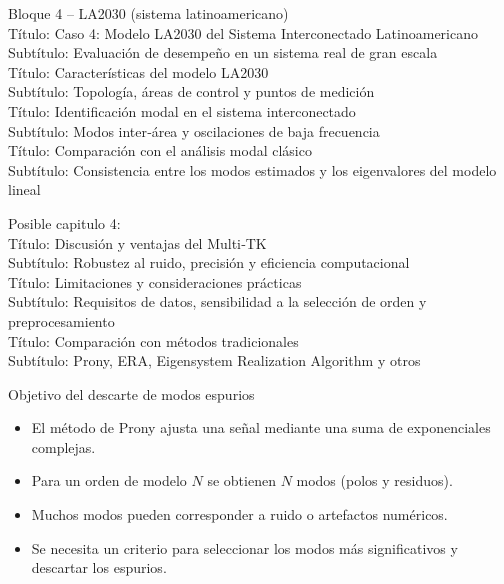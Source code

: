 \documentclass{beamer}
\begin{document}
\begin{frame}
Bloque 4 – LA2030 (sistema latinoamericano)\\
Título: Caso 4: Modelo LA2030 del Sistema Interconectado Latinoamericano\\
Subtítulo: Evaluación de desempeño en un sistema real de gran escala\\

Título: Características del modelo LA2030\\
Subtítulo: Topología, áreas de control y puntos de medición\\

Título: Identificación modal en el sistema interconectado\\
Subtítulo: Modos inter‑área y oscilaciones de baja frecuencia\\

Título: Comparación con el análisis modal clásico\\
Subtítulo: Consistencia entre los modos estimados y los eigenvalores del modelo lineal\\

\end{frame}

\begin{frame}
    Posible capitulo 4: \\

Título: Discusión y ventajas del Multi‑TK\\
Subtítulo: Robustez al ruido, precisión y eficiencia computacional\\

Título: Limitaciones y consideraciones prácticas\\
Subtítulo: Requisitos de datos, sensibilidad a la selección de orden y preprocesamiento\\

Título: Comparación con métodos tradicionales\\
Subtítulo: Prony, ERA, Eigensystem Realization Algorithm y otros\\

\end{frame}




\begin{frame}{Objetivo del descarte de modos espurios}
\begin{itemize}
  \item El método de Prony ajusta una señal mediante una suma de exponenciales complejas.
  \item Para un orden de modelo \(N\) se obtienen \(N\) modos (polos y residuos).
  \item Muchos modos pueden corresponder a ruido o artefactos numéricos.
  \item Se necesita un criterio para seleccionar los modos más significativos y descartar los espurios.
\end{itemize}
\end{frame}
\end{document}
